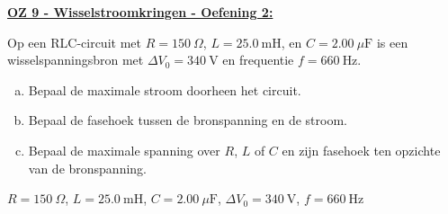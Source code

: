 \textbf{\underline{OZ 9 - Wisselstroomkringen - Oefening 2:}}
\vspace{0.5cm}

Op een RLC-circuit met $R = 150 \ \Omega$, $L = 25.0 \ \text{mH}$, en $ C = 2.00 \ \mu\text{F}$ is een wisselspanningsbron met $\Delta V_0 = 340 \ \text{V}$ en frequentie $f = 660 \ \text{Hz}$.

\begin{enumerate}[(a)]
    \item Bepaal de maximale stroom doorheen het circuit.
    \item Bepaal de fasehoek tussen de bronspanning en de stroom.
    \item Bepaal de maximale spanning over $R$, $L$ of $C$ en zijn fasehoek ten opzichte van de bronspanning.
\end{enumerate}

\begin{description}[labelwidth=1.5cm, leftmargin=!]
    \item[Geg. :] $R = 150 \ \Omega$, $L = 25.0 \ \text{mH}$, $ C = 2.00 \ \mu\text{F}$, $\Delta V_0 = 340 \ \text{V}$, $f = 660 \ \text{Hz}$
\end{description}

